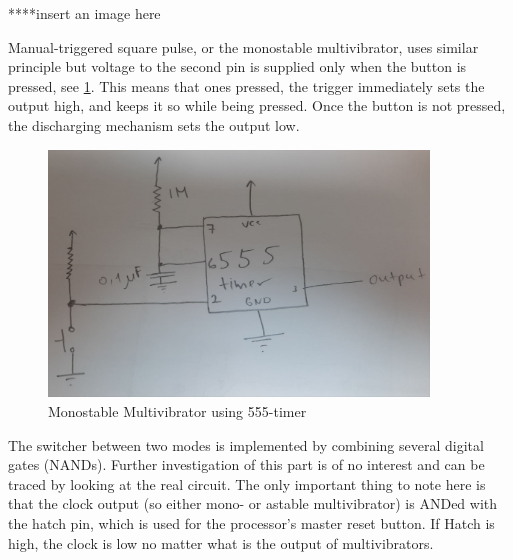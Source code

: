 ****insert an image here

Manual-triggered square pulse, or the monostable multivibrator, uses similar principle but voltage to the second pin is supplied only when the button is pressed, see \ref{fig:monostable}. This means that ones pressed, the trigger immediately sets the output high, and keeps it so while being pressed. Once the button is not pressed, the discharging mechanism sets the output low.

\begin{figure}[H]
	\centering
	\includegraphics[width=0.9\textwidth]{img/monostable}
	\caption{Monostable Multivibrator using 555-timer}
	\label{fig:monostable}
\end{figure}

The switcher between two modes is implemented by combining several digital gates (NANDs). Further investigation of this part is of no interest and can be traced by looking at the real circuit. The only important thing to note here is that the clock output (so either mono- or astable multivibrator) is ANDed with the hatch pin, which is used for the processor's master reset button. If Hatch is high, the clock is low no matter what is the output of multivibrators.


